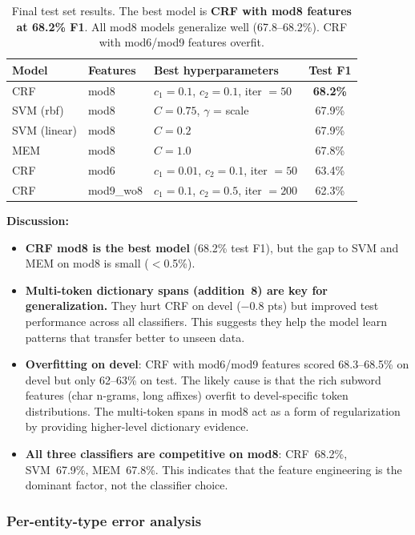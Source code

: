 \documentclass[a4paper,12pt]{article}
\newcommand{\callout}[1]{\textbf{\textcolor{tabgreen}{#1}}}
\begin{document}
\begin{table}[H]
\centering
\begin{tabular}{l l l c}
\hline
\textbf{Model} & \textbf{Features} & \textbf{Best hyperparameters} & \textbf{Test F1} \\
\hline
\rowcolor{green!18} CRF & mod8 & $c_1 = 0.1$, $c_2 = 0.1$, iter $= 50$ & \textbf{68.2\%} \\
SVM (rbf)    & mod8 & $C = 0.75$, $\gamma$ = scale & 67.9\% \\
SVM (linear) & mod8 & $C = 0.2$ & 67.9\% \\
MEM          & mod8 & $C = 1.0$ & 67.8\% \\
\hline
\rowcolor{red!10} CRF & mod6 & $c_1 = 0.01$, $c_2 = 0.1$, iter $= 50$ & 63.4\% \\
\rowcolor{red!10} CRF & mod9\_wo8 & $c_1 = 0.1$, $c_2 = 0.5$, iter $= 200$ & 62.3\% \\
\hline
\end{tabular}
\caption{Final test set results. The best model is \textbf{CRF with mod8 features at 68.2\% F1}. All mod8 models generalize well (67.8--68.2\%). CRF with mod6/mod9 features overfit.}
\label{tab:final-results}
\end{table}

\callout{Discussion:}
\begin{itemize}[nosep]
    \item \textbf{CRF mod8 is the best model} (68.2\% test F1), but the gap to SVM and MEM on mod8 is small ($<$0.5\%).
    \item \textbf{Multi-token dictionary spans (addition~8) are key for generalization.} They hurt CRF on devel ($-$0.8 pts) but improved test performance across all classifiers. This suggests they help the model learn patterns that transfer better to unseen data.
    \item \textbf{Overfitting on devel}: CRF with mod6/mod9 features scored 68.3--68.5\% on devel but only 62--63\% on test. The likely cause is that the rich subword features (char n-grams, long affixes) overfit to devel-specific token distributions. The multi-token spans in mod8 act as a form of regularization by providing higher-level dictionary evidence.
    \item \textbf{All three classifiers are competitive on mod8}: CRF~68.2\%, SVM~67.9\%, MEM~67.8\%. This indicates that the feature engineering is the dominant factor, not the classifier choice.
\end{itemize}

\subsubsection{Per-entity-type error analysis}
\end{document}
